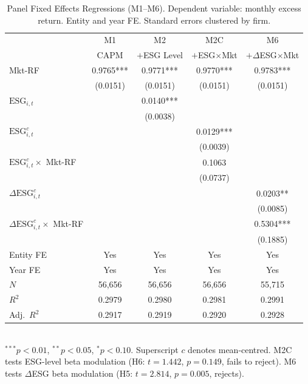 \begin{table}[H]
  \centering
  \caption{Panel Fixed Effects Regressions (M1--M6). Dependent variable: monthly excess return. Entity and year FE. Standard errors clustered by firm.}
  \label{tab:panel}
  \begin{tabular}{lcccc}
    \toprule
    & M1 & M2 & M2C & M6 \\
    & CAPM & $+$ESG Level & $+$ESG$\times$Mkt & $+\Delta$ESG$\times$Mkt \\
    \midrule
    Mkt-RF                           & 0.9765*** & 0.9771*** & 0.9770*** & 0.9783*** \\
                                      & (0.0151)  & (0.0151)  & (0.0151)  & (0.0151)  \\[3pt]
    $\mathrm{ESG}_{i,t}$             &           & 0.0140*** &           &           \\
                                      &           & (0.0038)  &           &           \\[3pt]
    $\mathrm{ESG}_{i,t}^c$           &           &           & 0.0129*** &           \\
                                      &           &           & (0.0039)  &           \\[3pt]
    $\mathrm{ESG}_{i,t}^c\times$ Mkt-RF &        &           & 0.1063    &           \\
                                      &           &           & (0.0737)  &           \\[3pt]
    $\Delta\mathrm{ESG}_{i,t}^c$     &           &           &           & 0.0203**  \\
                                      &           &           &           & (0.0085)  \\[3pt]
    $\Delta\mathrm{ESG}_{i,t}^c\times$ Mkt-RF & &           &           & 0.5304*** \\
                                      &           &           &           & (0.1885)  \\[3pt]
    \midrule
    Entity FE                         & Yes & Yes & Yes & Yes \\
    Year FE                           & Yes & Yes & Yes & Yes \\
    $N$                               & 56,656 & 56,656 & 56,656 & 55,715 \\
    $R^2$                             & 0.2979 & 0.2980 & 0.2981 & 0.2991 \\
    Adj.\ $R^2$                       & 0.2917 & 0.2919 & 0.2920 & 0.2928 \\
    \bottomrule
  \end{tabular}
  \smallskip\\
  \footnotesize $^{***}p<0.01$, $^{**}p<0.05$, $^{*}p<0.10$. Superscript $c$ denotes mean-centred. M2C tests ESG-level beta modulation (H6: $t=1.442$, $p=0.149$, fails to reject). M6 tests $\Delta$ESG beta modulation (H5: $t=2.814$, $p=0.005$, rejects).
\end{table}


